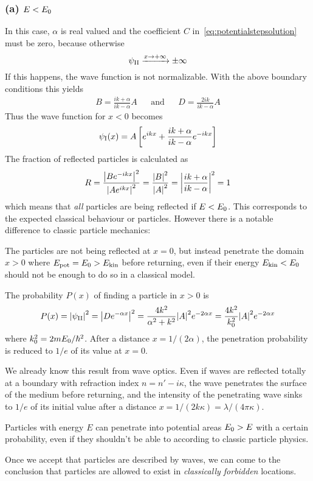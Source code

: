 \documentclass[../../script.tex]{subfiles}
\begin{document}
\subsubsection{(a) $E < E_{\text{0}}$}
In this case, $\alpha$ is real valued and the coefficient $C$ in~\eqref{eq:potentialstepsolution} must be zero, because otherwise
\[
	\wave[II] \xrightarrow{x \rightarrow +\infty} \pm\infty
\]
If this happens, the wave function is not normalizable. With the above boundary conditions this yields
\begin{align}
	B = \frac{ik + \alpha}{ik - \alpha}A && \text{and} && D = \frac{2ik}{ik - \alpha} A
\end{align}
Thus the wave function for $x < 0$ becomes 
\begin{equation}
	\wave[I](x) = A \left[ e^{ikx} + \frac{ik + \alpha}{ik - \alpha}e^{-ikx} \right]
\end{equation}
The fraction of reflected particles is calculated as 
\begin{equation}\label{eq:reflectioncoefffirst}
	R = \frac{\abs{Be^{-ikx}}^2}{\abs{Ae^{ikx}}^2} = \frac{\abs{B}^2}{\abs{A}^2} = \abs{\frac{ik + \alpha}{ik - \alpha}}^2 = 1
\end{equation}
which means that \textit{all} particles are being reflected if $E < E_{\text{0}}$. This corresponds to the expected classical behaviour or particles.
However there is a notable difference to classic particle mechanics:
\begin{tcolorbox}
	The particles are not being reflected at $x = 0$, but instead penetrate the domain $x > 0$ where $E_{\text{pot}} = E_{\text{0}} > E_{\text{kin}}$ before returning,
	even if their energy $E_{\text{kin}} < E_{\text{0}}$ should not be enough to do so in a classical model.
\end{tcolorbox}
The probability $P(x)$ of finding a particle in $x > 0$ is 
\begin{equation}
	P(x) = \abs{\wave[II]}^2 = \abs{De^{-\alpha x}}^2 = \frac{4k^2}{\alpha^2 + k^2} \abs{A}^2 e^{-2\alpha x} = \frac{4k^2}{k_0^2} \abs{A}^2 e^{-2\alpha x}
\end{equation}
where $k_0^2 = 2mE_{\text{0}} / \hbar^2$. After a distance $x = 1/(2\alpha)$, the penetration probability is reduced to $1/e$ of its value at $x = 0$.

We already know this result from wave optics. Even if waves are reflected totally at a boundary with refraction index $n = n' - i\kappa$, the wave penetrates the surface of the medium before returning, and the intensity
of the penetrating wave sinks to $1/e$ of its initial value after a distance $x = 1/(2k\kappa) = \lambda/(4\pi\kappa)$.
\begin{tcolorbox}
	Particles with energy $E$ can penetrate into potential areas $E_{\text{0}} > E$ with a certain probability, even if they shouldn't be able to according to classic particle physics.
\end{tcolorbox}
Once we accept that particles are described by waves, we can come to the conclusion that particles are allowed to exist in \textit{classically forbidden} locations.
\end{document}
